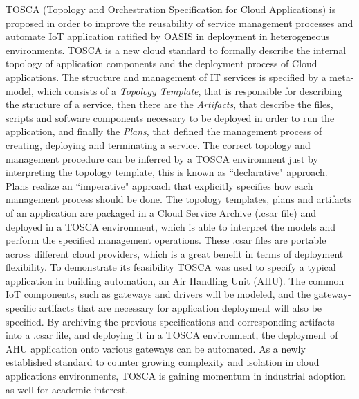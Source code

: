 TOSCA (Topology and Orchestration Specification for Cloud Applications) \cite{li2013towards} is
proposed in order to improve the reusability of service management processes and automate IoT application
ratified by OASIS in \cite{} deployment in heterogeneous environments. TOSCA is a new cloud standard to formally
describe the internal topology of application components and the deployment process of Cloud applications.
The structure and management of IT services is specified by a meta-model, which consists of
a \textit{Topology Template}, that is responsible for describing the structure of a service, then there
are the \textit{Artifacts}, that describe the files, scripts and software components necessary to be
deployed in order to run the application, and finally the \textit{Plans}, that defined the management process
of creating, deploying and terminating a service. The correct topology and management procedure can be inferred
by a TOSCA environment just by interpreting the topology template, this is known as ``declarative" approach.
Plans realize an ``imperative" approach that explicitly specifies how each management process should be done.
The topology templates, plans and artifacts of an application are packaged in a Cloud Service Archive (.csar file)
and deployed in a TOSCA environment, which is able to interpret the models and perform the specified management
operations. These .csar files are portable across different cloud providers, which is a great benefit in terms
of deployment flexibility. To demonstrate its feasibility TOSCA was used to specify a typical application in
building automation, an Air Handling Unit (AHU). The common IoT components, such as gateways and
drivers will be modeled, and the gateway-specific artifacts that are necessary for application deployment
will also be specified. By archiving the previous specifications and corresponding artifacts into a .csar file,
and deploying it in a TOSCA environment, the deployment of AHU application onto various gateways can be automated.
As a newly established standard to counter growing complexity and isolation in cloud applications environments,
TOSCA is gaining momentum in industrial adoption as well for academic interest.\\


